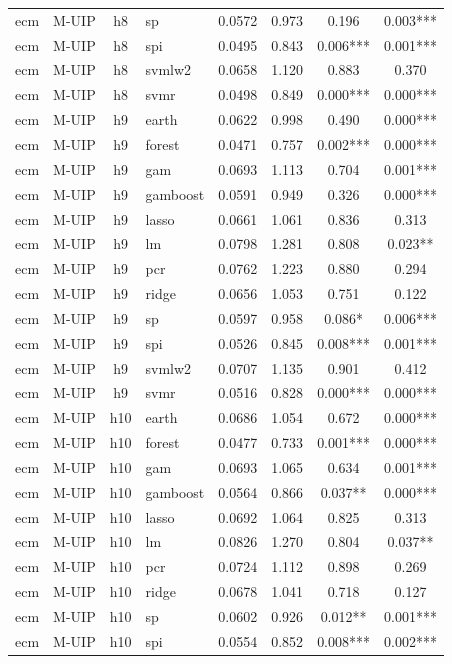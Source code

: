 \begin{ThreePartTable}
\begin{longtable}[t]{llclcccc}
ecm & M-UIP & h8 & sp & 0.0572 & 0.973 & 0.196 & 0.003***\\
ecm & M-UIP & h8 & spi & 0.0495 & 0.843 & 0.006*** & 0.001***\\
ecm & M-UIP & h8 & svmlw2 & 0.0658 & 1.120 & 0.883 & 0.370\\
ecm & M-UIP & h8 & svmr & 0.0498 & 0.849 & 0.000*** & 0.000***\\
\addlinespace
ecm & M-UIP & h9 & earth & 0.0622 & 0.998 & 0.490 & 0.000***\\
ecm & M-UIP & h9 & forest & 0.0471 & 0.757 & 0.002*** & 0.000***\\
ecm & M-UIP & h9 & gam & 0.0693 & 1.113 & 0.704 & 0.001***\\
ecm & M-UIP & h9 & gamboost & 0.0591 & 0.949 & 0.326 & 0.000***\\
ecm & M-UIP & h9 & lasso & 0.0661 & 1.061 & 0.836 & 0.313\\
ecm & M-UIP & h9 & lm & 0.0798 & 1.281 & 0.808 & 0.023**\\
ecm & M-UIP & h9 & pcr & 0.0762 & 1.223 & 0.880 & 0.294\\
ecm & M-UIP & h9 & ridge & 0.0656 & 1.053 & 0.751 & 0.122\\
ecm & M-UIP & h9 & sp & 0.0597 & 0.958 & 0.086* & 0.006***\\
ecm & M-UIP & h9 & spi & 0.0526 & 0.845 & 0.008*** & 0.001***\\
ecm & M-UIP & h9 & svmlw2 & 0.0707 & 1.135 & 0.901 & 0.412\\
ecm & M-UIP & h9 & svmr & 0.0516 & 0.828 & 0.000*** & 0.000***\\
\addlinespace
ecm & M-UIP & h10 & earth & 0.0686 & 1.054 & 0.672 & 0.000***\\
ecm & M-UIP & h10 & forest & 0.0477 & 0.733 & 0.001*** & 0.000***\\
ecm & M-UIP & h10 & gam & 0.0693 & 1.065 & 0.634 & 0.001***\\
ecm & M-UIP & h10 & gamboost & 0.0564 & 0.866 & 0.037** & 0.000***\\
ecm & M-UIP & h10 & lasso & 0.0692 & 1.064 & 0.825 & 0.313\\
ecm & M-UIP & h10 & lm & 0.0826 & 1.270 & 0.804 & 0.037**\\
ecm & M-UIP & h10 & pcr & 0.0724 & 1.112 & 0.898 & 0.269\\
ecm & M-UIP & h10 & ridge & 0.0678 & 1.041 & 0.718 & 0.127\\
ecm & M-UIP & h10 & sp & 0.0602 & 0.926 & 0.012** & 0.001***\\
ecm & M-UIP & h10 & spi & 0.0554 & 0.852 & 0.008*** & 0.002***\\

\end{longtable}
\end{ThreePartTable}
